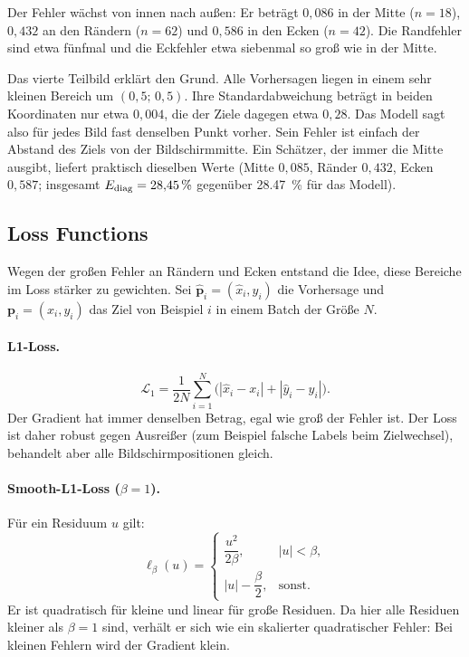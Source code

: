 Der Fehler wächst von innen nach außen: Er beträgt $0,086$ in der Mitte
($n=18$), $0,432$ an den Rändern ($n=62$) und $0,586$ in den Ecken ($n=42$).
Die Randfehler sind etwa fünfmal und die Eckfehler etwa siebenmal so groß wie
in der Mitte.

Das vierte Teilbild erklärt den Grund. Alle Vorhersagen liegen in einem sehr
kleinen Bereich um $(0,5;\,0,5)$. Ihre Standardabweichung beträgt in beiden
Koordinaten nur etwa $0,004$, die der Ziele dagegen etwa $0,28$. Das Modell
sagt also für jedes Bild fast denselben Punkt vorher. Sein Fehler ist einfach
der Abstand des Ziels von der Bildschirmmitte. Ein Schätzer, der immer die
Mitte ausgibt, liefert praktisch dieselben Werte (Mitte $0,085$, Ränder
$0,432$, Ecken $0,587$; insgesamt $E_{\mathrm{diag}}=\SI{28,45}{\percent}$ gegenüber
\SI{28,47}{\percent} für das Modell).

\subsection{Loss Functions}
\label{sec:losses}

Wegen der großen Fehler an Rändern und Ecken entstand die Idee, diese Bereiche
im Loss stärker zu gewichten. Sei $\hat{\bm p}_i=(\hat x_i,\hat y_i)$ die
Vorhersage und $\bm p_i=(x_i,y_i)$ das Ziel von Beispiel $i$ in einem Batch der
Größe $N$.

\paragraph{L1-Loss.}
\begin{equation}
  \mathcal{L}_{1} = \frac{1}{2N}\sum_{i=1}^{N}\bigl(|\hat x_i-x_i| + |\hat y_i-y_i|\bigr).
\end{equation}
Der Gradient hat immer denselben Betrag, egal wie groß der Fehler ist. Der
Loss ist daher robust gegen Ausreißer (zum Beispiel falsche Labels beim
Zielwechsel), behandelt aber alle Bildschirmpositionen gleich.

\paragraph{Smooth-L1-Loss ($\beta=1$).}
Für ein Residuum $u$ gilt:
\begin{equation}
  \ell_\beta(u) =
  \begin{cases}
    \dfrac{u^2}{2\beta}, & |u| < \beta,\\[1.2ex]
    |u| - \dfrac{\beta}{2}, & \text{sonst.}
  \end{cases}
\end{equation}
Er ist quadratisch für kleine und linear für große Residuen. Da hier alle
Residuen kleiner als $\beta=1$ sind, verhält er sich wie ein skalierter
quadratischer Fehler: Bei kleinen Fehlern wird der Gradient klein.

